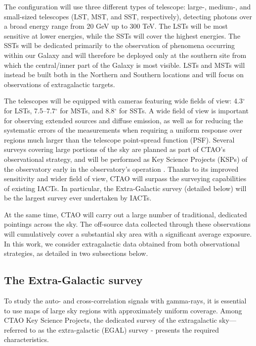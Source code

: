 \documentclass[aps,prd,a4paper,reprint,nofootinbib,superscriptaddress,floatfix,preprintnumbers]{revtex4-2}
\begin{document}
The configuration will use three different types of telescope: large-, medium-, and small-sized telescopes (LST, MST, and SST, respectively), detecting photons over a broad energy range from 20 GeV up to 300 TeV. The LSTs will be most sensitive at lower energies, while the SSTs will cover the highest energies. The SSTs will be {dedicated primarily to the observation of}  phenomena occurring within our Galaxy and will {therefore be deployed only at the southern site from which} the central/inner part of the Galaxy is most visible. LSTs and MSTs will instead be built both in the Northern and Southern locations and will focus on observations of extragalactic targets.

The telescopes will be equipped with cameras featuring wide fields of view: 
{4.3$^\circ$} for LSTs, {7.5--7.7$^\circ$} for MSTs, and {8.8$^\circ$} for SSTs. A wide field of view is important for observing extended sources and diffuse emission, as well as for reducing the systematic errors of the measurements when requiring a uniform response over regions much larger than the telescope point-spread function (PSF). Several surveys covering large portions of the sky are planned as part of CTAO's observational strategy, and will be performed as Key Science Projects (KSPs) of the observatory early in the observatory's operation 
\cite{CTAConsortium:2017dvg}. Thanks to its improved sensitivity and wider field of view, {CTAO will surpass} the surveying capabilities of existing IACTs. In particular, the Extra-Galactic survey (detailed below) { will be} the largest survey ever undertaken by IACTs.   

At the same time, CTAO will carry out a large number of traditional, dedicated pointings across the sky. The off-source data collected through these observations will cumulatively cover a substantial sky area with a significant average exposure. In this work, we consider extragalactic data obtained from both observational strategies, as detailed in two subsections below.

\subsection{The Extra-Galactic survey}

To study the auto- and cross-correlation signals with gamma-rays, {it is essential to use maps of large sky regions with approximately uniform coverage}. Among CTAO Key Science Projects, the dedicated survey of the extragalactic sky---referred to as the extra-galactic (EGAL) survey - presents the required characteristics.
\end{document}
